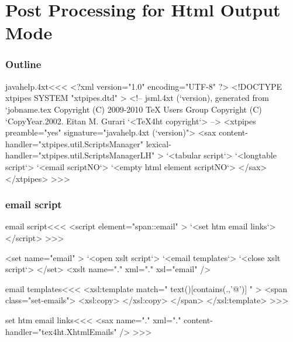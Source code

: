 \documentclass{article}
\begin{document}




\part{Post Processing for Html Output Mode}


\section{Outline}



\<javahelp.4xt\><<<
<?xml version="1.0" encoding="UTF-8" ?>
<!DOCTYPE xtpipes SYSTEM "xtpipes.dtd" >
<!-- jsml.4xt (`version), generated from `jobname.tex
     Copyright (C) 2009-2010 TeX Users Group
     Copyright (C) `CopyYear.2002. Eitan M. Gurari
`<TeX4ht copyright`> -->
<xtpipes preamble="yes" signature="javahelp.4xt (`version)">
   <sax content-handler="xtpipes.util.ScriptsManager" 
        lexical-handler="xtpipes.util.ScriptsManagerLH" >
     `<tabular script`>
     `<longtable script`>
     `<email scriptNO`>
     `<empty html element scriptNO`>
   </sax>
</xtpipes>
>>>


\section{email script}

\<email script\><<<
<script element="span::email" >
   `<set htm email links`>
</script> 
>>>

   <set name="email" >
      `<open xslt script`>
      `<email templates`>
      `<close xslt script`>
   </set>
   <xslt name="." xml="." xsl="email" />


\<email templates\><<<
<xsl:template match=" text()[contains(.,'@')] " >
<span class="set-emails">
      <xsl:copy>
      </xsl:copy> 
</span>     
</xsl:template> 
>>>


\<set htm email links\><<<
<sax name="." xml="." content-handler="tex4ht.XhtmlEmails" />
>>>


 
\end{document}
